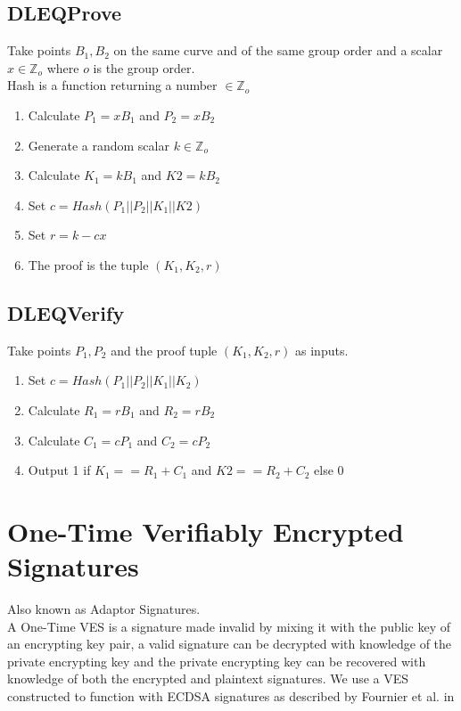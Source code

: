 \documentclass[a4paper]{article}
\begin{document}
\subsection{DLEQProve}
Take points $B_{1}, B_{2}$ on the same curve and of the same group order and a scalar $x \in \mathbb{Z}_{o}$ where $o$ is the group order.\\
Hash is a function returning a number $\in \mathbb{Z}_{o}$\\
\begin{enumerate}
    \item Calculate $P_{1} = xB_{1}$ and $P_{2} = xB_{2}$
    \item Generate a random scalar $k \in \mathbb{Z}_{o}$
    \item Calculate $K_{1} = kB_{1}$ and $K2 = kB_{2}$
    \item Set $c = Hash(P_{1} || P_{2} || K_{1} || K2)$
    \item Set $r = k - cx$
    \item The proof is the tuple $(K_{1}, K_{2}, r)$
\end{enumerate}

\subsection{DLEQVerify}
Take points $P_{1}, P_{2}$ and the proof tuple $(K_{1}, K_{2}, r)$ as inputs.
\begin{enumerate}
    \item Set $c = Hash(P_{1} || P_{2} || K_{1} || K_{2}) $
    \item Calculate $R_{1} = rB_{1}$ and $R_{2} = rB_{2}$
    \item Calculate $C_{1} = cP_{1}$ and $C_{2} = cP_{2}$
    \item Output 1 if $K_{1} == R_{1} + C_{1}$ and $K2 == R_{2} + C_{2}$ else 0
\end{enumerate}



\section{One-Time Verifiably Encrypted Signatures}
Also known as Adaptor Signatures.\\
A One-Time VES is a signature made invalid by mixing it with the public key of an encrypting key pair, a valid signature can be decrypted with knowledge of the private encrypting key and the private encrypting key can be recovered with knowledge of both the encrypted and plaintext signatures.
We use a VES constructed to function with ECDSA signatures as described by Fournier et al. in \cite{oneTimeVES}\\
\end{document}
